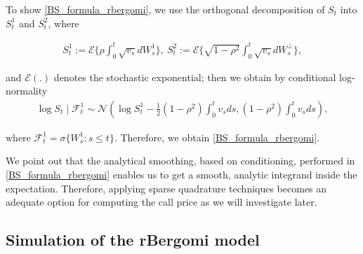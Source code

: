 To show \eqref{BS_formula_rbergomi}, we use the orthogonal decomposition of $S_t$ into $S_{t}^1$ and $S_{t}^2$, where

\begin{align*}
	S_t^1:=\mathcal{E}\{ \rho \int_{0}^{t}  \sqrt{v_s} dW_s^1\}, \: S_t^2:= \mathcal{E}\{ \sqrt{1-\rho^2} \int_{0}^{t}  \sqrt{v_s} dW_s^\perp  \}	,
\end{align*}

and $\mathcal{E}(.)$ denotes the stochastic exponential; then we obtain by conditional log-normality
\begin{align*}
	\log S_t \mid \mathcal{F}_t^1 \sim \mathcal{N}\left( \log S_t^1-\frac{1}{2} (1-\rho^2) \int_{0}^{t} v_s ds , (1-\rho^2) \int_{0}^{t} v_s ds \right),
\end{align*} 

where $\mathcal{F}_t^1= \sigma\{ W_s^1: s\le t\}$. Therefore, we obtain \eqref{BS_formula_rbergomi}.



We point out that the analytical smoothing, based on conditioning, performed in \eqref{BS_formula_rbergomi} enables us to get a smooth, analytic integrand inside the expectation. Therefore, applying sparse quadrature techniques becomes an adequate option for computing the call price as we will investigate later.

\subsection{Simulation of the rBergomi model}\label{sec:Simulation of the rBergomi model}

